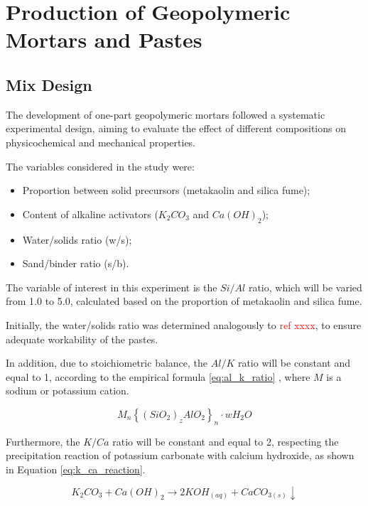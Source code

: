 \section{Production of Geopolymeric Mortars and Pastes}
\label{sec:production_geopolymeric_mortars_pastes}

\subsection{Mix Design}
\label{subsec:mix_design}

The development of one-part geopolymeric mortars followed a systematic experimental design, aiming to evaluate the effect of different compositions on physicochemical and mechanical properties.

The variables considered in the study were:

\begin{itemize}
    \item Proportion between solid precursors (metakaolin and silica fume);
    \item Content of alkaline activators ($K_2CO_3$ and $Ca(OH)_2$);
    \item Water/solids ratio (w/s);
    \item Sand/binder ratio (s/b).
\end{itemize}

The variable of interest in this experiment is the $Si/Al$ ratio, which will be varied from 1.0 to 5.0, calculated based on the proportion of metakaolin and silica fume.

Initially, the water/solids ratio was determined analogously to \textcolor{red}{ref xxxx}, to ensure adequate workability of the pastes.

In addition, due to stoichiometric balance, the $Al/K$ ratio will be constant and equal to 1, according to the empirical formula \ref{eq:al_k_ratio} \cite{joseph1991geopolymers}, where $M$ is a sodium or potassium cation.

\begin{equation}
    \label{eq:al_k_ratio}
    M_n \left\{ \left(SiO_2 \right)_z AlO_2 \right\}_n \cdot wH_2O
\end{equation}

Furthermore, the $K/Ca$ ratio will be constant and equal to 2, respecting the precipitation reaction of potassium carbonate with calcium hydroxide, as shown in Equation \ref{eq:k_ca_reaction}.

\begin{equation}
    \label{eq:k_ca_reaction}
    K_2CO_3 + Ca(OH)_2 \rightarrow  2KOH_{(aq)} + CaCO_{3(s)} \downarrow
\end{equation}


